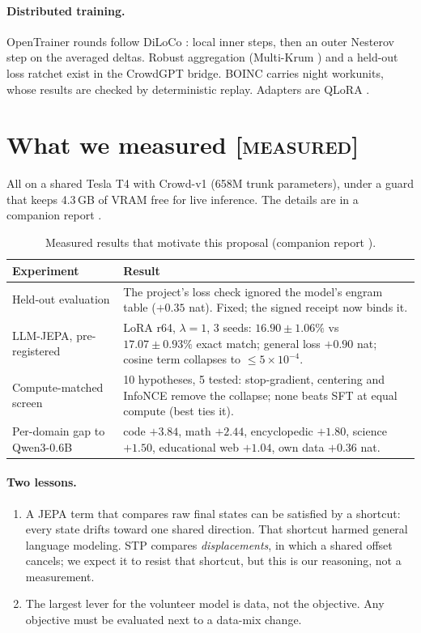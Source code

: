 \documentclass[11pt]{article}
\newcommand{\measured}{\textnormal{\textsc{[measured]}}}
\begin{document}
\paragraph{Distributed training.} OpenTrainer rounds follow DiLoCo \cite{douillard2023diloco}: local inner steps, then
an outer Nesterov step on the averaged deltas. Robust aggregation (Multi-Krum \cite{blanchard2017krum}) and a held-out
loss ratchet exist in the CrowdGPT bridge. BOINC \cite{anderson2004boinc} carries night workunits, whose results are
checked by deterministic replay. Adapters are QLoRA \cite{dettmers2023qlora}.

\section{What we measured \measured}
\label{sec:measured}
All on a shared Tesla T4 with Crowd-v1 (658M trunk parameters), under a guard that keeps 4.3\,GB of VRAM free for live
inference. The details are in a companion report \cite{callens2026crowd}.

\begin{table}[h]
\centering\small
\caption{Measured results that motivate this proposal (companion report \cite{callens2026crowd}).}
\label{tab:measured}
\begin{tabular}{p{4.1cm}p{10.2cm}}
\toprule
Experiment & Result\\
\midrule
Held-out evaluation & The project's loss check ignored the model's engram table ($+0.35$ nat). Fixed; the signed
receipt now binds it.\\
LLM-JEPA, pre-registered & LoRA r64, $\lambda{=}1$, 3 seeds: $16.90\pm1.06\%$ vs $17.07\pm0.93\%$ exact match; general
loss $+0.90$ nat; cosine term collapses to $\le5\times10^{-4}$.\\
Compute-matched screen & 10 hypotheses, 5 tested: stop-gradient, centering and InfoNCE remove the collapse; none beats
SFT at equal compute (best ties it).\\
Per-domain gap to Qwen3-0.6B & code $+3.84$, math $+2.44$, encyclopedic $+1.80$, science $+1.50$, educational web
$+1.04$, own data $+0.36$ nat.\\
\bottomrule
\end{tabular}
\end{table}

\paragraph{Two lessons.}
\begin{enumerate}
\item A JEPA term that compares raw final states can be satisfied by a shortcut: every state drifts toward one shared
direction. That shortcut harmed general language modeling. STP compares \emph{displacements}, in which a shared offset
cancels; we expect it to resist that shortcut, but this is our reasoning, not a measurement.
\item The largest lever for the volunteer model is data, not the objective. Any objective must be evaluated next to a
data-mix change.
\end{enumerate}
\end{document}
